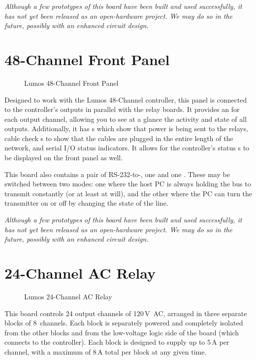 \documentclass[letterpaper,twoside,onecolumn,openright,final]{memoir}
\begin{document}
\emph{Although a few prototypes of this board have been built and used successfully, it has not yet been
released as an open-hardware project.  We may do so in the future, possibly with an enhanced circuit
design.}

\section{48-Channel Front Panel}
\begin{figure}
  \begin{center}
  \end{center}
  \caption{Lumos 48-Channel Front Panel}
\end{figure}
Designed to work with the Lumos 48-Channel controller, this panel is connected to the controller's outputs
in parallel with the relay boards.  It provides an  for each output channel, allowing you
to see at a glance the activity and state of all outputs.  Additionally, it has s which show
that power is being sent to the relays, cable check s to show that the cables are plugged in
the entire length of the network, and serial I/O status indicators. It allows for the controller's status
s to be displayed on the front panel as well.

This board also contains a pair of RS-232-to-, one  and one .
These may be switched between two modes: one where the host PC is always holding the bus to transmit
constantly (or at least at will), and the other where the PC can turn the transmitter on or off by
changing the state of the  line.

\emph{Although a few prototypes of this board have been built and used successfully, it has not yet been
released as an open-hardware project.  We may do so in the future, possibly with an enhanced circuit
design.}

\section{24-Channel AC Relay}
\begin{figure}
  \begin{center}
  \end{center}
  \caption{Lumos 24-Channel AC Relay}
\end{figure}
This board controls 24 output channels of 120\,V~AC, arranged in three separate blocks of 8~channels.
Each block is separately powered and completely isolated from the other blocks and from the low-voltage
logic side of the board (which connects to the controller).  Each block is designed to supply up to
5\,A per channel, with a maximum of 8\,A total per block at any given time.
\end{document}

